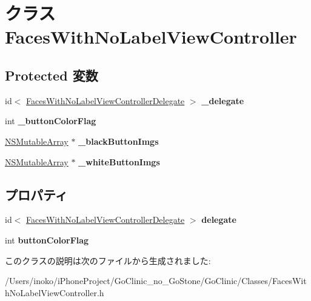 \hypertarget{interface_faces_with_no_label_view_controller}{
\section{クラス FacesWithNoLabelViewController}
\label{interface_faces_with_no_label_view_controller}
}
\subsection*{Protected 変数}
\begin{DoxyCompactItemize}
\item 
\hypertarget{interface_faces_with_no_label_view_controller_ad93c8faea945b3c48b94f055c6375178}{
id$<$ \hyperlink{protocol_faces_with_no_label_view_controller_delegate-p}{FacesWithNoLabelViewControllerDelegate} $>$ {\bfseries \_\-delegate}}
\label{interface_faces_with_no_label_view_controller_ad93c8faea945b3c48b94f055c6375178}

\item 
\hypertarget{interface_faces_with_no_label_view_controller_a480a3518426001503da6c3dbff060a73}{
int {\bfseries \_\-buttonColorFlag}}
\label{interface_faces_with_no_label_view_controller_a480a3518426001503da6c3dbff060a73}

\item 
\hypertarget{interface_faces_with_no_label_view_controller_ac53192172530e4a03456d06574c16679}{
\hyperlink{class_n_s_mutable_array}{NSMutableArray} $\ast$ {\bfseries \_\-blackButtonImgs}}
\label{interface_faces_with_no_label_view_controller_ac53192172530e4a03456d06574c16679}

\item 
\hypertarget{interface_faces_with_no_label_view_controller_a7ec6a400202ad38ede4512bcd1e0f75a}{
\hyperlink{class_n_s_mutable_array}{NSMutableArray} $\ast$ {\bfseries \_\-whiteButtonImgs}}
\label{interface_faces_with_no_label_view_controller_a7ec6a400202ad38ede4512bcd1e0f75a}

\end{DoxyCompactItemize}
\subsection*{プロパティ}
\begin{DoxyCompactItemize}
\item 
\hypertarget{interface_faces_with_no_label_view_controller_a7478381f8f326f2aed24674dfc976e2b}{
id$<$ \hyperlink{protocol_faces_with_no_label_view_controller_delegate-p}{FacesWithNoLabelViewControllerDelegate} $>$ {\bfseries delegate}}
\label{interface_faces_with_no_label_view_controller_a7478381f8f326f2aed24674dfc976e2b}

\item 
\hypertarget{interface_faces_with_no_label_view_controller_af8b0053ebbad66d1c674fb2e6cfb28a6}{
int {\bfseries buttonColorFlag}}
\label{interface_faces_with_no_label_view_controller_af8b0053ebbad66d1c674fb2e6cfb28a6}

\end{DoxyCompactItemize}


このクラスの説明は次のファイルから生成されました:\begin{DoxyCompactItemize}
\item 
/Users/inoko/iPhoneProject/GoClinic\_\-no\_\-GoStone/GoClinic/Classes/FacesWithNoLabelViewController.h\end{DoxyCompactItemize}
